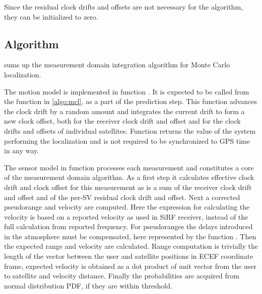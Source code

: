 Since the residual clock drifts and offsets are not necessary for the algorithm,
they can be initialized to zero.

\subsection{Algorithm}
 sums up the measurement domain integration
algorithm for Monte Carlo localization.

The motion model is implemented in function \predictGPS{}.
It is expected to be called from the function \sampleFromActionModel{} in \cref{algo:mcl},
as a part of the prediction step.
This function advances the clock drift by a random amount
and integrates the current drift to form a new clock offset,
both for the receiver clock drift and offset and for the
clock drifts and offsets of individual satellites.
Function \timeFunc{} returns the value of the system performing the localization
and is not required to be synchronized to GPS time in any way.

The sensor model in function \observationProbabilityGPS{} processes each measurement
and constitutes a core of the measurement domain algorithm.
As a first step it calculates effective clock drift and clock offset for this
measurement as is a sum of the receiver clock drift and offset and of the 
per-SV residual clock drift and offset.
Next a corrected pseudorange and velocity are computed.
Here the expression for calculating the velocity is based on a reported velocity
as used in SiRF receiver, instead of the full calculation from reported frequency.
For pseudoranges the delays introduced in the atmosphere must be compensated,
here represented by the function \delays{}.
Then the expected range and velocity are calculated.
Range computation is trivially the length of the vector between the user and 
satellite positions in ECEF coordinate frame, expected velocity is obtained
as a dot product of unit vector from the user to satellite and velocity distance.
Finally the probabilities are acquired from normal distribution PDF, if they
are within threshold.

